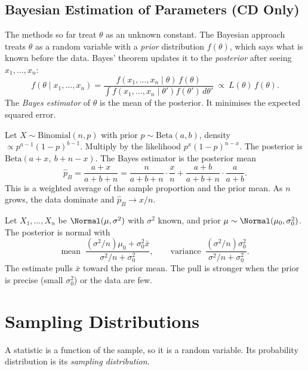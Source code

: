 \subsection{Bayesian Estimation of Parameters (CD Only)}

The methods so far treat $\theta$ as an unknown constant. The Bayesian approach treats $\theta$ as a random variable with a \emph{prior} distribution $f(\theta)$, which says what is known before the data. Bayes' theorem updates it to the \emph{posterior} after seeing $x_1,\dots,x_n$:
\[ f(\theta\mid x_1,\dots,x_n)=\frac{f(x_1,\dots,x_n\mid\theta)\,f(\theta)}{\int f(x_1,\dots,x_n\mid\theta')f(\theta')\,d\theta'}\ \propto\ L(\theta)\,f(\theta). \]
The \emph{Bayes estimator} of $\theta$ is the mean of the posterior. It minimises the expected squared error.

\begin{example}\label{ex:betabin}
Let $X\sim\mathrm{Binomial}(n,p)$ with prior $p\sim\mathrm{Beta}(a,b)$, density $\propto p^{a-1}(1-p)^{b-1}$. Multiply by the likelihood $p^x(1-p)^{n-x}$. The posterior is $\mathrm{Beta}(a+x,\ b+n-x)$. The Bayes estimator is the posterior mean
\[ \hat{p}_B=\frac{a+x}{a+b+n}=\frac{n}{a+b+n}\cdot\frac xn+\frac{a+b}{a+b+n}\cdot\frac a{a+b}. \]
This is a weighted average of the sample proportion and the prior mean. As $n$ grows, the data dominate and $\hat{p}_B\to x/n$.
\end{example}

\begin{example}
Let $X_1,\dots,X_n$ be $\Normal(\mu,\sigma^2)$ with $\sigma^2$ known, and prior $\mu\sim\Normal(\mu_0,\sigma_0^2)$. The posterior is normal with
\[ \text{mean }\ \frac{(\sigma^2/n)\mu_0+\sigma_0^2\bar{x}}{\sigma^2/n+\sigma_0^2},\qquad\text{variance }\ \frac{(\sigma^2/n)\sigma_0^2}{\sigma^2/n+\sigma_0^2}. \]
The estimate pulls $\bar{x}$ toward the prior mean. The pull is stronger when the prior is precise (small $\sigma_0^2$) or the data are few.
\end{example}

\section{Sampling Distributions}

\begin{definition}
A statistic is a function of the sample, so it is a random variable. Its probability distribution is its \emph{sampling distribution}.
\end{definition}

